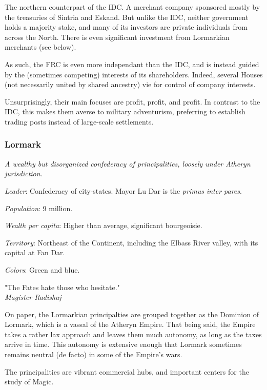 The northern counterpart of the IDC. A merchant company sponsored mostly by the treasuries of Sintria and Eskand. But unlike the IDC, neither government holds a majority stake, and many of its investors are private individuals from across the North. There is even significant investment from Lormarkian merchants (see below).

As such, the FRC is even more independant than the IDC, and is instead guided by the (sometimes competing) interests of its shareholders. Indeed, several Houses (not necessarily united by shared ancestry) vie for control of company interests.

Unsurprisingly, their main focuses are profit, profit, and profit. In contrast to the IDC, this makes them averse to military adventurism, preferring to establish trading posts instead of large-scale settlements.



\subsubsection{Lormark}

\textit{A wealthy but disorganized confederacy of principalities, loosely under Atheryn jurisdiction.}

\textit{Leader}: Confederacy of city-states. Mayor Lu Dar is the \textit{primus inter pares}.

\textit{Population}: 9 million.

\textit{Wealth per capita}: Higher than average, significant bourgeoisie.

\textit{Territory}: Northeast of the Continent, including the Elbass River valley, with its capital at Fan Dar.
    
\textit{Colors}: Green and blue.


\begin{rpg-quotebox}
"The Fates hate those who hesitate." \\ \textendash \textit{Magister Radishaj}
\end{rpg-quotebox}


On paper, the Lormarkian principalties are grouped together as the Dominion of Lormark, which is a vassal of the Atheryn Empire. That being said, the Empire takes a rather lax approach and leaves them much autonomy, as long as the taxes arrive in time. This autonomy is extensive enough that Lormark sometimes remains neutral (de facto) in some of the Empire's wars.

The principalities are vibrant commercial hubs, and important centers for the study of Magic.

